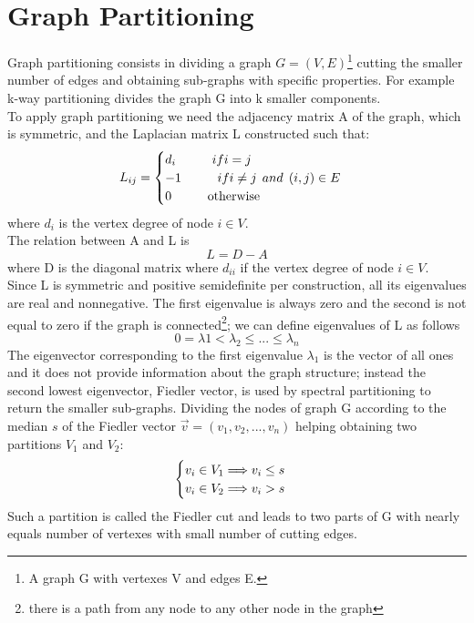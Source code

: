 \documentclass[12 pt]{article}
\newcommand\tab[1][1cm]{\hspace*{#1}}
\begin{document}
\section{Graph Partitioning}
Graph partitioning consists in dividing a graph $G=(V,E)$\footnote{A graph G with vertexes V and edges E.}  cutting the smaller number of edges and obtaining sub-graphs with specific properties. For example k-way partitioning divides the graph G into k smaller components.\\
To apply graph partitioning we need the adjacency matrix A of the graph, which is symmetric, and the Laplacian matrix L constructed such that:
\begin{equation}\notag
L_{ij} = 
\begin{cases}
d_i \tab if i=j \\
-1 \tab if i \neq j \:\: and \: \: (i,j) \in E \\
0 \tab \text{otherwise}
\end{cases}
\end{equation}
where $d_i$ is the vertex degree of node $i \in V$.\\
The relation between A and L is
$$L = D - A$$
where D is the diagonal matrix where $d_{ii}$ if the vertex degree of node $i \in V$.\\
Since L is symmetric and positive semidefinite per construction, all its eigenvalues are real and nonnegative. The first eigenvalue is always zero and the second is not equal to zero if the graph is connected\footnote{there is a path from any node to any other node in the graph}; we can define eigenvalues of L as follows
$$ 0 = \lambda1 < \lambda_2 \leq ... \leq \lambda_n$$
The eigenvector corresponding to the first eigenvalue $\lambda_1$ is the vector of all ones and it does not provide information about the graph structure; instead the second lowest eigenvector, Fiedler vector, is used by spectral partitioning to return the smaller sub-graphs. Dividing the nodes of graph G according to the median $s$ of the Fiedler vector $\vec{v} = (v_1,v_2,...,v_n)$ helping obtaining two partitions $V_1$ and $V_2$:
\begin{equation}\notag
\begin{cases}
v_i \in V_1 \Longrightarrow v_i \leq s \\
v_i \in V_2 \Longrightarrow v_i > s
\end{cases}
\end{equation}
Such a partition is called the Fiedler cut and leads to two parts of G with nearly equals number of vertexes with small number of cutting edges.
\end{document}
